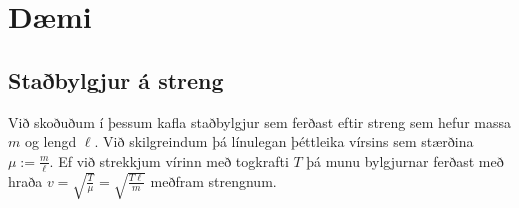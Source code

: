 \newpage

\section{Dæmi}

\subsection*{Staðbylgjur á streng}

\begin{tcolorbox}
Við skoðuðum í þessum kafla staðbylgjur sem ferðast eftir streng sem hefur massa $m$ og lengd $\ell$. Við skilgreindum þá línulegan þéttleika vírsins sem stærðina $\mu := \frac{m}{\ell}$. Ef við strekkjum vírinn með togkrafti $T$ þá munu bylgjurnar ferðast með hraða $v = \sqrt{\frac{T}{\mu}} = \sqrt{\frac{T \ell }{m}}$ meðfram strengnum.
\end{tcolorbox}

